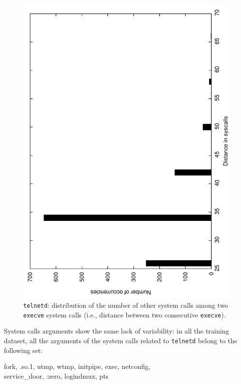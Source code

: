 \begin{figure}[tb]
  \centering
  \includegraphics[angle=-90,width=.8\textwidth]{figures/host/syscall/telnet}
  \caption{\texttt{telnetd}: distribution of the number of other
  system calls among two \texttt{execve} system calls (i.e., distance
  between two consecutive \texttt{execve}).}
  \label{fig:exectelnet}
\end{figure}

System calls arguments show the same lack of variability: in all the
training dataset, all the arguments of the system calls related to
\texttt{telnetd} belong to the following set:

\begin{center}\footnotesize\ttfamily
  fork, .so.1, utmp, wtmp, initpipe, exec, netconfig,\\ service\_door,
  :zero, logindmux, pts
\end{center}

